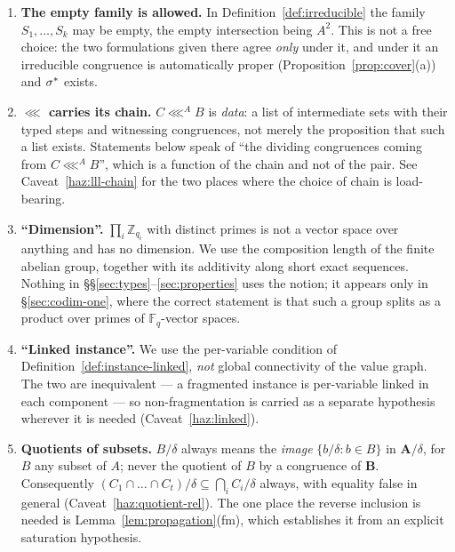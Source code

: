 \begin{enumerate}
\item\label{leg:emptyfamily}\textbf{The empty family is allowed.}
In Definition~\ref{def:irreducible} the family $S_{1},\dots,S_{k}$ may be
empty, the empty intersection being $A^{2}$. This is not a free choice: the
two formulations given there agree \emph{only} under it, and under it an
irreducible congruence is automatically proper (Proposition~\ref{prop:cover}(a))
and $\sigma^{*}$ exists.

\item\label{leg:chain}\textbf{$\lll$ carries its chain.} $C\lll^{A}B$ is
\emph{data}: a list of intermediate sets with their typed steps and witnessing
congruences, not merely the proposition that such a list exists. Statements
below speak of ``the dividing congruences coming from $C\lll^{A}B$'', which is
a function of the chain and not of the pair. See Caveat~\ref{haz:lll-chain} for
the two places where the choice of chain is load-bearing.

\item\label{leg:dimension}\textbf{``Dimension''.} $\prod_{i}\mathbb Z_{q_{i}}$
with distinct primes is not a vector space over anything and has no dimension.
We use the composition length of the finite abelian group, together with its
additivity along short exact sequences. Nothing in
\S\S\ref{sec:types}--\ref{sec:properties} uses the notion; it appears only in
\S\ref{sec:codim-one}, where the correct statement is that such a group splits
as a product over primes of $\mathbb F_{q}$-vector spaces.

\item\label{leg:linked}\textbf{``Linked instance''.} We use the per-variable
condition of Definition~\ref{def:instance-linked}, \emph{not} global
connectivity of the value graph. The two are inequivalent --- a fragmented
instance is per-variable linked in each component --- so non-fragmentation is
carried as a separate hypothesis wherever it is needed
(Caveat~\ref{haz:linked}).

\item\label{leg:quotient}\textbf{Quotients of subsets.} $B/\delta$ always
means the \emph{image} $\{b/\delta:b\in B\}$ in $\mathbf A/\delta$, for $B$ any
subset of $A$; never the quotient of $B$ by a congruence of $\mathbf B$.
Consequently $(C_{1}\cap\dots\cap C_{t})/\delta\subseteq\bigcap_{i}C_{i}/\delta$
always, with equality false in general (Caveat~\ref{haz:quotient-rel}). The one
place the reverse inclusion is needed is Lemma~\ref{lem:propagation}(fm), which
establishes it from an explicit saturation hypothesis.


\end{enumerate}
